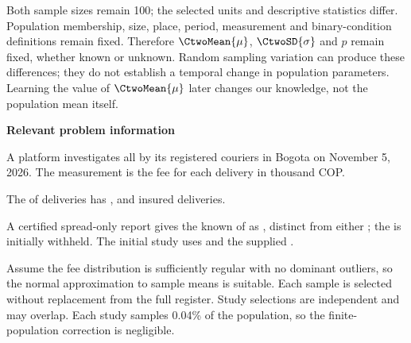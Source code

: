 Both sample sizes remain 100; the selected units and descriptive statistics differ. Population membership, size, place, period, measurement and binary-condition definitions remain fixed. Therefore $\CtwoMean{\mu}$, $\CtwoSD{\sigma}$ and $p$ remain fixed, whether known or unknown. Random sampling variation can produce these differences; they do not establish a temporal change in population parameters. Learning the value of $\CtwoMean{\mu}$ later changes our knowledge, not the population mean itself.

\secInicio[][sec:p3]

\clearpage



\textbf{Relevant problem information}

\begin{probleminfoexcerpt}
A platform investigates all    by its registered couriers in Bogota on November 5, 2026. The measurement is the fee for each delivery in thousand COP.
\end{probleminfoexcerpt}

\begin{probleminfoexcerpt}
The     of  deliveries has     ,       and  insured deliveries.
\end{probleminfoexcerpt}

\begin{probleminfoexcerpt}
A certified spread-only report gives the known    of  as   , distinct from either   ; the   is initially withheld. The initial study uses   and the supplied      .
\end{probleminfoexcerpt}

\begin{probleminfoexcerpt}
Assume the fee distribution is sufficiently regular with no dominant outliers, so the normal approximation to sample means is suitable. Each sample is selected without replacement from the full register. Study selections are independent and may overlap. Each study samples 0.04\% of the population, so the finite-population correction is negligible.
\end{probleminfoexcerpt}

